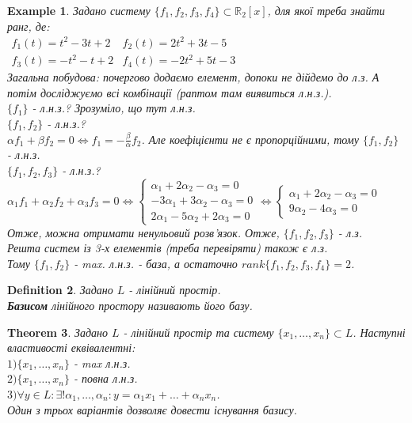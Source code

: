 \documentclass[a4paper, 10pt]{article}
\theoremstyle{theoremdd}
\newtheorem{theorem}{Theorem}[subsection]
\newtheorem{definition}[theorem]{Definition}
\newtheorem{example}[theorem]{Example}
\begin{document}
	\begin{example}
	Задано систему $\{f_1, f_2, f_3, f_4\} \subset \mathbb{R}_2[x]$, для якої треба знайти ранг, де:\\
	$\begin{matrix}
	f_1(t) = t^2-3t+2 & f_2(t) = 2t^2+3t-5 \\
	f_3(t) = -t^2-t+2 & f_4(t) = -2t^2+5t-3
	\end{matrix}
	$\\
	Загальна побудова: почергово додаємо елемент, допоки не дійдемо до л.з. А потім досліджуємо всі комбінації (раптом там виявиться л.н.з.).\\
	$\{f_1\}$ - л.н.з.? Зрозуміло, що тут л.н.з.\\
	$\{f_1, f_2 \}$ - л.н.з.? \\ $\alpha f_1 + \beta f_2 = 0 \iff \displaystyle f_1 = -\frac{\beta}{\alpha}f_2$. Але коефіцієнти не є пропорційними, тому $\{f_1, f_2\}$ - л.н.з.\\
	$\{f_1, f_2, f_3\}$ - л.н.з.? \\
	$\alpha_1 f_1 + \alpha_2 f_2 + \alpha_3 f_3 = 0 \iff 
	\begin{cases}
	\alpha_1 + 2\alpha_2 - \alpha_3 = 0 \\
	-3\alpha_1 + 3\alpha_2 - \alpha_3 = 0 \\
	2\alpha_1 - 5\alpha_2 + 2\alpha_3 = 0
	\end{cases} \iff
	\begin{cases}
	\alpha_1 + 2\alpha_2 - \alpha_3 = 0 \\
	9\alpha_2 - 4\alpha_3 = 0
	\end{cases}
	$\\
	Отже, можна отримати ненульовий розв'язок. Отже, $\{f_1, f_2, f_3\}$ - л.з.\\
	Решта систем із 3-х елементів (треба перевіряти) також є л.з.\\
	Тому $\{f_1, f_2\}$ - max. л.н.з. - база, а остаточно $rank\{f_1, f_2, f_3, f_4 \} = 2$.
	\end{example}
	
	\begin{definition}
	Задано $L$ - лінійний простір.\\
	\textbf{Базисом} лінійного простору називають його базу.
	\end{definition}
	
	\iffalse
	\begin{theorem}
	Задано $L$ - лінійний простір та систему $\{x_1, \dots, x_n\} \subset L$. Наступні властивості еквівалентні:\\
	$1) \{x_1, \dots, x_n\}$ - max л.н.з.\\
	$2) \{x_1, \dots, x_n\}$ - повна л.н.з.\\
	$3) \forall y \in L: \exists! \alpha_1, \dots, \alpha_n: y = \alpha_1 x_1 + \dots + \alpha_n x_n$.\\
	\textit{Один з трьох варіантів дозволяє довести існування базису.}
	\end{theorem}
	
\end{document}
